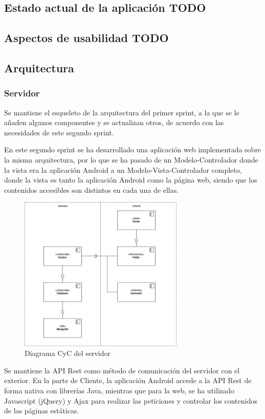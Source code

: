 \documentclass[11pt,a4paper]{report}
\begin{document}
\subsection{Estado actual de la aplicación TODO}
\subsection{Aspectos de usabilidad TODO}
\subsection{Arquitectura}
\subsubsection{Servidor}
Se mantiene el esqueleto de la arquitectura del primer sprint, a la que se le añaden algunos componentes y se actualizan otros, de acuerdo con las necesidades de este segundo sprint.

En este segundo sprint se ha desarrollado una aplicación web implementada sobre la misma arquitectura, por lo que se ha pasado de un Modelo-Controlador donde la vista era la aplicación Android a un Modelo-Vista-Controlador completo, donde la vista es tanto la aplicación Android como la página web, siendo que los contenidos accesibles son distintos en cada una de ellas.

\begin{figure}[H]
	\centering
	\includegraphics[width=0.7\textwidth]{graficos/CyCserver.png}
	\caption{Diagrama CyC del servidor }
	\label{fig: CyCServ2}
\end{figure}
Se mantiene la API Rest como método de comunicación del servidor con el exterior. En la parte de Cliente, la aplicación Android accede a la API Rest de forma nativa con librerías Java, mientras que para la web, se ha utilizado Javascript (jQuery) y Ajax para realizar las peticiones y controlar los contenidos de las páginas estáticas.
\end{document}
